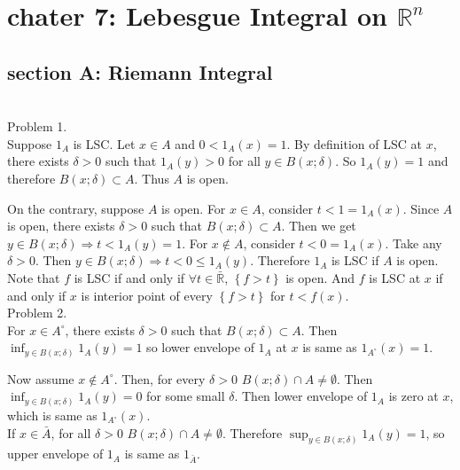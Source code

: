 \section*{chater 7: Lebesgue Integral on $\mathbb{R}^n$}

\subsection*{section A: Riemann Integral} \hfill \\

Problem 1. \\

Suppose $1_A$ is LSC. Let $x \in A$ and $0 < 1_A(x) = 1$. By definition of LSC at $x$, there exists $\delta>0$ such that $1_A(y) > 0$ for all $y \in B\left( x ; \delta \right) $. So $1_A(y) = 1$ and therefore $B\left( x ; \delta \right) \subset A$. Thus $A$ is open.

On the contrary, suppose $A$ is open. For $x \in A$, consider $t < 1 = 1_A(x)$. Since $A$ is open, there exists $\delta>0$ such that $B\left( x;\delta \right) \subset A$. Then we get $y\in B\left( x;\delta \right) \Rightarrow t < 1_A(y) = 1$.
For $x \notin A$, consider $t<0 = 1_A(x)$. Take any $\delta > 0$. Then $y \in B\left( x ; \delta \right) \Rightarrow t < 0 \leq 1_A(y)$. Therefore $1_A$ is LSC if $A$ is open.\\

Note that $f$ is LSC if and only if $\forall t \in \bar{\mathbb{R}}$, $\left\{ f > t \right\}$ is open.
And $f$ is LSC at $x$ if and only if $x$ is interior point of every $\left\{ f>t \right\}$ for $t < f(x)$.\\

Problem 2. \\

For $x \in A^\circ$, there exists $\delta > 0$ such that $B\left( x ; \delta \right) \subset A$. Then $\inf_{y \in B\left( x ; \delta \right)}1_A(y) = 1$ so lower envelope of $1_A$ at $x$ is same as $1_{A^\circ}(x)=1$.

Now assume $x \notin A^\circ$. Then, for every $\delta>0$ $B\left( x;\delta \right) \cap A \ne \emptyset$. Then $\inf_{y \in B\left( x;\delta \right)}1_A(y) = 0$ for some small $\delta$. Then lower envelope of $1_A$ is zero at $x$, which is same as $1_{A^\circ}(x)$.\\

If $x \in \bar{A}$, for all $\delta >0$ $B\left( x;\delta \right) \cap A \ne \emptyset$. Therefore $\sup_{y\in B\left( x;\delta \right)}1_A(y) = 1$, so upper envelope of $1_A$ is same as $1_{\bar{A}}$.

